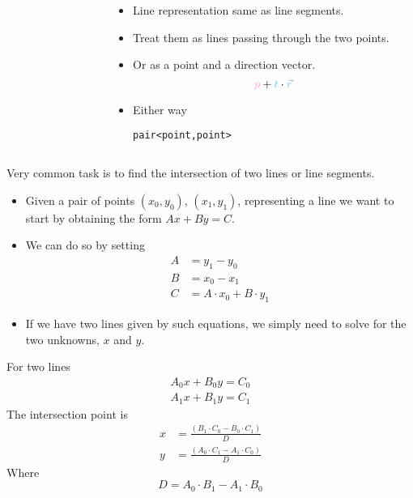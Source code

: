 \documentclass[12pt,t]{beamer}
\newcommand{\bi}{\begin{itemize}}
\newcommand{\ei}{\end{itemize}}
\begin{document}
\begin{frame}[fragile]
\begin{columns}
\begin{column}{0.5\textwidth}
\begin{figure}
      \end{figure}
    \end{column}
    \begin{column}{0.6\textwidth}
      \bi
        \item Line representation same as line segments.
        \item Treat them as lines passing through the two points.
        \item Or as a point and a direction vector.
          \[
            {\color{vhilight!70}p} + {\color{hilight!70}t} \cdot {\color{title!80}\vec{r}}
          \]
        \vspace{-10pt}
        \item Either way
          \begin{verbatim}
pair<point,point>
          \end{verbatim}
      \ei
    \end{column}
  \end{columns}
\end{frame}


\begin{frame}
  Very common task is to find the intersection of two lines or line segments.
  \bi
    \item Given a pair of points $(x_0, y_0)$, $(x_1, y_1)$, representing a
      line we want to start by obtaining the form $Ax + By = C$.
    \item We can do so by setting
      \begin{align*}
        A &= y_1 - y_0 \\
        B &= x_0 - x_1 \\
        C &= A\cdot x_0 + B\cdot y_1
      \end{align*}
    \vspace{-10pt}
    \item If we have two lines given by such equations, we simply need to solve
      for the two unknowns, $x$ and $y$.
  \ei
\end{frame}

\begin{frame}
  For two lines
  \begin{align*}
    A_0 x + B_0 y = C_0  \\
    A_1 x + B_1 y = C_1
  \end{align*}
  The intersection point is
  \begin{align*}
      x &= \frac{(B_1 \cdot C_0 - B_0 \cdot C_1)}{D} \\
      y &= \frac{(A_0 \cdot C_1 - A_1 \cdot C_0)}{D}
  \end{align*}
  Where
  \[
    D = A_0 \cdot B_1 - A_1 \cdot B_0
  \]
\end{frame}
\end{document}
